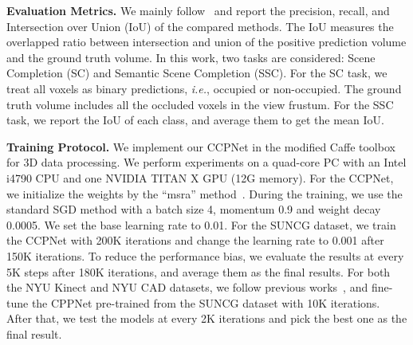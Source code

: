\documentclass[10pt,twocolumn,letterpaper]{article}
\begin{document}
\textbf{Evaluation Metrics.} We mainly follow~\cite{song2017semantic} and report the precision, recall, and Intersection over Union (IoU) of the compared methods.
The IoU measures the overlapped ratio between intersection and union of the positive prediction volume and
the ground truth volume.
In this work, two tasks are considered: Scene Completion (SC) and Semantic Scene Completion (SSC).
For the SC task, we treat all voxels as binary predictions, \emph{i.e.}, occupied or non-occupied.
The ground truth volume includes all the occluded voxels in the view frustum.
For the SSC task, we report the IoU of each class, and average them to get the mean IoU.

\textbf{Training Protocol.} We implement our CCPNet in the modified Caffe toolbox~\cite{jia2014caffe} for 3D data processing.
We perform experiments on a quad-core PC with an Intel i4790 CPU and one NVIDIA TITAN X GPU (12G memory).
For the CCPNet, we initialize the weights by the ``msra'' method~\cite{he2015delving}.
During the training, we use the standard SGD method with a batch size 4, momentum 0.9 and weight decay 0.0005.
We set the base learning rate to 0.01.
For the SUNCG dataset, we train the CCPNet with 200K iterations and change the learning rate to 0.001 after 150K iterations.
To reduce the performance bias, we evaluate the results at every 5K steps after 180K iterations, and average them as the final results.
For both the NYU Kinect and NYU CAD datasets, we follow previous works~\cite{song2017semantic,guo2018view,garbade2018two,zhang2018efficient,liu2018see}, and fine-tune the CPPNet pre-trained from the SUNCG dataset with 10K iterations.
After that, we test the models at every 2K iterations and pick the best one as the final result.
\vspace{-2mm}
\end{document}
